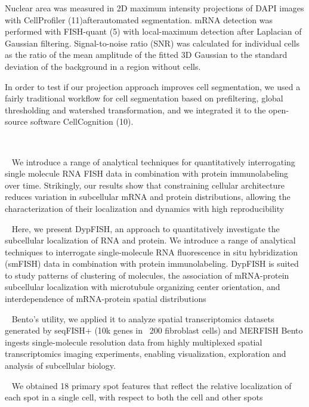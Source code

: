 Nuclear area was measured in 2D maximum intensity projections of DAPI images
with CellProfiler (11)afterautomated segmentation. mRNA detection was performed
with FISH-quant (5) with local-maximum detection after Laplacian of Gaussian
filtering. Signal-to-noise ratio (SNR) was calculated for individual cells as
the ratio of the mean amplitude of the fitted 3D Gaussian to the standard
deviation of the background in a region without cells.

In order to test if our projection approach improves cell segmentation,
we used a fairly traditional workflow for cell segmentation based on prefiltering,
global thresholding and watershed transformation, and we integrated it to the
open-source software CellCognition (10).

~\cite{samacoits_computational_2018}


~\cite{savulescu_dypfish_2019}
We introduce a range of analytical techniques for quantitatively interrogating
single molecule RNA FISH data in combination with protein immunolabeling over time.
Strikingly, our results show that constraining cellular architecture reduces
variation in subcellular mRNA and protein distributions, allowing the
characterization of their localization and dynamics with high reproducibility

~\cite{savulescu_interrogating_2021}
Here, we present DypFISH, an approach to quantitatively investigate the
subcellular localization of RNA and protein. We introduce a range of analytical
techniques to interrogate single-molecule RNA fluorescence in situ hybridization
(smFISH) data in combination with protein immunolabeling. DypFISH is suited to
study patterns of clustering of molecules, the association of mRNA-protein
subcellular localization with microtubule organizing center orientation, and
interdependence of mRNA-protein spatial distributions


~\cite{mah_bento_2022}
Bento’s utility, we applied it to analyze spatial transcriptomics datasets generated by seqFISH+ (10k genes in ~200 fibroblast cells) and MERFISH
Bento ingests single-molecule resolution data from highly multiplexed
spatial transcriptomics imaging experiments, enabling visualization, exploration and analysis of subcellular
biology.


~\cite{battich_image-based_2013}
We obtained 18 primary spot features that reflect the
relative localization of each spot in a single cell, with respect to both the cell and other spots

